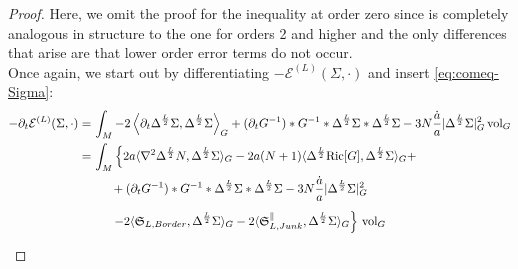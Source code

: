 \documentclass[11pt,leqno,textwidth=10cm]{amsart}
\numberwithin{equation}{section}
\theoremstyle{definition}
\theoremstyle{plain}
\newcommand{\1}{\mathbbm{1}}
\newcommand{\E}{\mathcal{E}}
\newcommand{\Ric}{\text{\normalfont{Ric}}}
\newcommand{\vol}[1]{{\text{\normalfont{vol}}}_{#1}}
\newcommand{\del}{\partial}
\newcommand{\Lap}{\Delta}
\begin{document}
\begin{proof}
Here, we omit the proof for the inequality at order zero since is completely analogous in structure to the one for orders 2 and higher and the only differences that arise are that lower order error terms do not occur. \\
Once again, we start out by differentiating $-\E^{(L)}(\Sigma,\cdot)$ and insert \eqref{eq:comeq-Sigma}:
\begin{align*}
-\del_t\E^{(L)}(\Sigma,\cdot)=&\,\int_M -2\left\langle\del_t\Lap^{\frac{L}2}\Sigma,\Lap^{\frac{L}2}\Sigma\right\rangle_G+(\del_tG^{-1})\ast G^{-1}\ast\Lap^{\frac{L}2}\Sigma\ast\Lap^{\frac{L}2}\Sigma-3N\frac{\dot{a}}a\lvert\Lap^{\frac{L}2}\Sigma\rvert_G^2\,\vol{G}\\
=&\,\int_M \left\{2a\langle\nabla^2\Lap^{\frac{L}2} N,\Lap^{\frac{L}2}\Sigma\rangle_G-2a(N+1)\langle\Lap^{\frac{L}2}\Ric[G],\Lap^{\frac{L}2}\Sigma\rangle_G+\right.\\
&\,\phantom{\int_M}+(\del_tG^{-1})\ast G^{-1}\ast\Lap^{\frac{L}2}\Sigma\ast\Lap^{\frac{L}2}\Sigma-3N\frac{\dot{a}}a\lvert\Lap^{\frac{L}2}\Sigma\rvert_G^2\\
&\,\phantom{\int_M}\left.-2\langle\mathfrak{S}_{L,Border},\Lap^{\frac{L}2}\Sigma\rangle_G-2\langle\mathfrak{S}_{L,Junk}^\parallel,\Lap^{\frac{L}2}\Sigma\rangle_G\right\}\,\vol{G}
\end{align*}


\end{proof}
\end{document}
